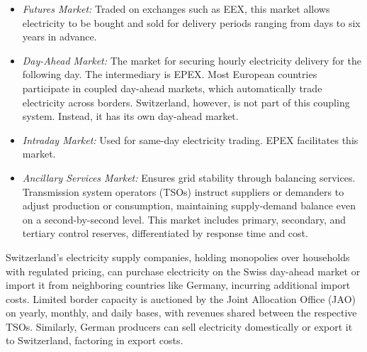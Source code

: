 \documentclass[12pt]{article}
\begin{document}
\begin{itemize}
    \item \textit{Futures Market:} Traded on exchanges such as EEX, this market allows electricity to be bought and sold for delivery periods ranging from days to six years in advance.
    \item \textit{Day-Ahead Market:} The market for securing hourly electricity delivery for the following day. The intermediary is EPEX. Most European countries participate in coupled day-ahead markets, which automatically trade electricity across borders. Switzerland, however, is not part of this coupling system. Instead, it has its own day-ahead market.
    \item \textit{Intraday Market:} Used for same-day electricity trading. EPEX facilitates this market. 
    \item \textit{Ancillary Services Market:} Ensures grid stability through balancing services. Transmission system operators (TSOs) instruct suppliers or demanders to adjust production or consumption, maintaining supply-demand balance even on a second-by-second level. This market includes primary, secondary, and tertiary control reserves, differentiated by response time and cost.
\end{itemize}

Switzerland's electricity supply companies, holding monopolies over households with regulated pricing, can purchase electricity on the Swiss day-ahead market or import it from neighboring countries like Germany, incurring additional import costs. Limited border capacity is auctioned by the Joint Allocation Office (JAO) on yearly, monthly, and daily bases, with revenues shared between the respective TSOs. Similarly, German producers can sell electricity domestically or export it to Switzerland, factoring in export costs.
\end{document}
